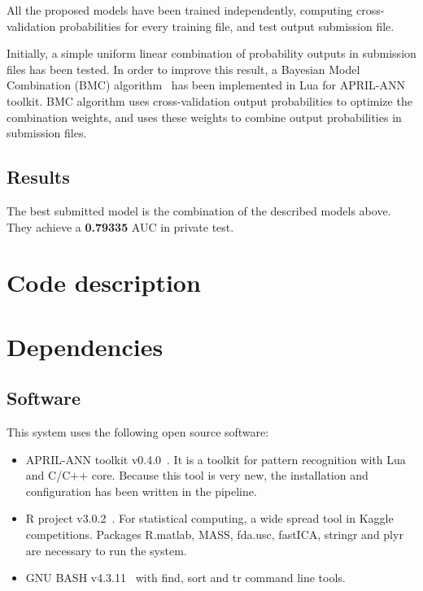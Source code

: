 \documentclass[a4paper,english,twoside]{article}
\begin{document}
All the proposed models have been trained independently, computing
cross-validation probabilities for every training file, and test output
submission file.

Initially, a simple uniform linear combination of probability outputs in
submission files has been tested. In order to improve this result, a Bayesian
Model Combination (BMC) algorithm~\cite{2011:monteith:ijcnn} has been
implemented in Lua for APRIL-ANN~\cite{aprilann} toolkit. BMC algorithm uses
cross-validation output probabilities to optimize the combination weights, and
uses these weights to combine output probabilities in submission files.

\subsection{Results}\label{results}

The best submitted model is the combination of the described models
above. They achieve a \textbf{0.79335} AUC in private test.

\section{Code description}\label{code-description}

\section{Dependencies}\label{dependencies}

\subsection{Software}\label{software}

This system uses the following open source software:

\begin{itemize}
\item APRIL-ANN toolkit v0.4.0~\cite{aprilann}.
  It is a toolkit for pattern recognition with Lua and C/C++ core.
  Because this tool is very new, the installation and configuration has
  been written in the pipeline.
\item R project v3.0.2~\cite{Rproject}. For statistical
  computing, a wide spread tool in Kaggle competitions. Packages
  R.matlab, MASS, fda.usc, fastICA, stringr and plyr are necessary to
  run the system.
\item GNU BASH v4.3.11~\cite{bash} with find, sort and tr command line tools.
\end{itemize}
\end{document}
